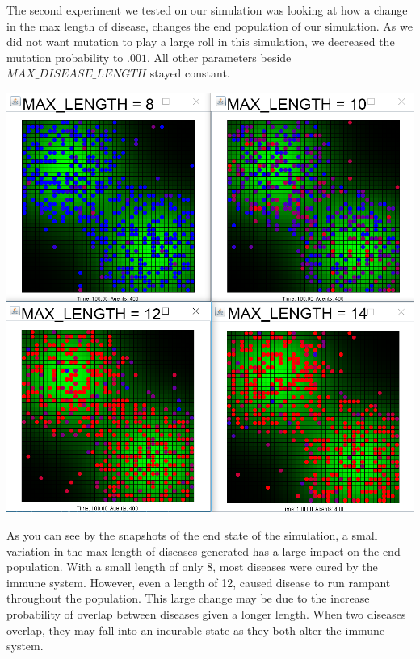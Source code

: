 \documentclass[12pt,a4paper]{article} %
\begin{document}
    The second experiment we tested on our simulation was looking at how a change in the max length of disease, changes the end population of our simulation. As we did not want mutation to play a large roll in this simulation, we decreased the mutation probability to $.001$. All other parameters beside $MAX\_DISEASE\_LENGTH$ stayed constant.
    
    \includegraphics[scale = .45]{Max_length.png}
    
    As you can see by the snapshots of the end state of the simulation, a small variation in the max length of diseases generated has a large impact on the end population. With a small length of only 8, most diseases were cured by the immune system. However, even a length of 12, caused disease to run rampant throughout the population. This large change may be due to the increase probability of overlap between diseases given a longer length. When two diseases overlap, they may fall into an incurable state as they both alter the immune system.
    
    
\end{document}
